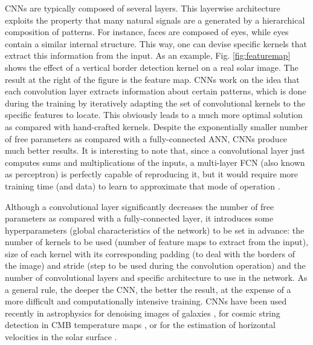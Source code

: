 CNNs are typically composed of several layers. This layerwise architecture exploits the 
property that many natural signals are a generated by a hierarchical composition of 
patterns. For instance, faces are composed of eyes, while eyes contain a similar internal structure. 
This way, one can devise specific kernels that extract this information from 
the input. As an example, Fig. \ref{fig:featuremap} shows the effect of a vertical border detection 
kernel on a real solar image. The result at the right of the figure is the feature map.  
CNNs work on the idea that each convolution layer extracts information about certain patterns, 
which is done during the training by iteratively adapting the set of convolutional
kernels to the specific features to locate. This obviously leads to a much more optimal solution as
compared with hand-crafted kernels. Despite the exponentially smaller 
number of free parameters as compared with a fully-connected ANN, CNNs produce much better 
results. It is interesting to note that, 
since a convolutional layer just computes sums and multiplications of the inputs, 
a multi-layer FCN (also known as perceptron) is perfectly capable of reproducing it, but it would require more 
training time (and data) to learn to approximate that mode of operation 
\cite{Peyrard15}.






Although a convolutional layer significantly decreases 
the number of free parameters as compared with a fully-connected layer, it 
introduces some hyperparameters (global characteristics of the network) to be set in 
advance: the number of kernels
to be used (number of feature maps to extract from the input), size of 
each kernel with its corresponding padding (to deal with the borders of the image)
and stride (step to be used during the convolution
operation) and the number of convolutional layers and specific architecture to 
use in the network. As a general rule, the deeper the CNN, the better the result, 
at the expense of a more difficult and computationally intensive training. CNNs
have been used recently in astrophysics for denoising images of galaxies 
\cite{schawinski17}, for cosmic string detection in CMB temperature 
maps \cite{Ciuca17}, or for the estimation of horizontal velocities 
in the solar surface \cite{Asensio2017} .

